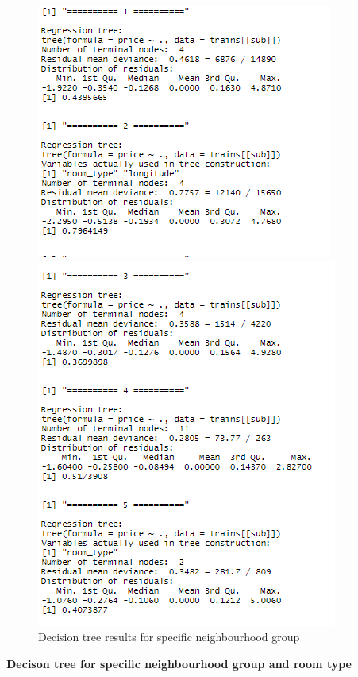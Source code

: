 \documentclass{FR16}
\begin{document}
\begin{figure}[!htb]
   \begin{minipage}{0.48\textwidth}
     \centering
     \includegraphics[width=.7\linewidth]{figures/dt1.1.PNG} 
   \end{minipage}\hfill
   \begin{minipage}{0.48\textwidth}
     \centering
     \includegraphics[width=.7\linewidth]{figures/dt1.2.PNG}
   \end{minipage}
        \caption{ Decision tree results for specific neighbourhood group}\label{fig:11}

\end{figure}

\newpage 
\noindent \textbf{Decison tree  for specific neighbourhood group and room type}
 
\end{document}
